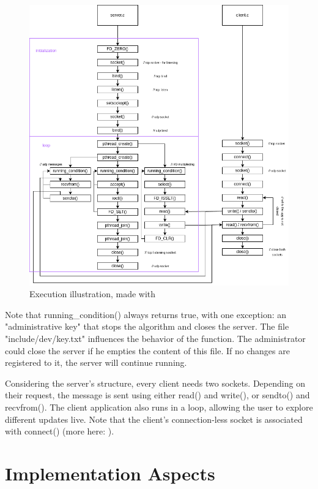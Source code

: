 \documentclass[runningheads]{llncs}
\begin{document}
\newpage
\begin{figure}[!h]
  \includegraphics[width=\textwidth]{RR execution diagram.drawio.png}
  \caption{Execution illustration, made with \cite{diagram-site}} 
  \label{fig:exe}
\end{figure}

Note that running\_condition() always returns true, with one exception: an "administrative key" that stops the algorithm and closes the server. The file "include/dev/key.txt" influences the behavior of the function. The administrator could close the server if he empties the content of this file. If no changes are registered to it, the server will continue running.

Considering the server's structure, every client needs two sockets. Depending on their request, the message is sent using either read() and write(), or sendto() and recvfrom(). The client application also runs in a loop, allowing the user to explore different updates live. Note that the client's connection-less socket is associated with connect() (more here: \cite{udp-connect}).


\section{Implementation Aspects}
\end{document}
